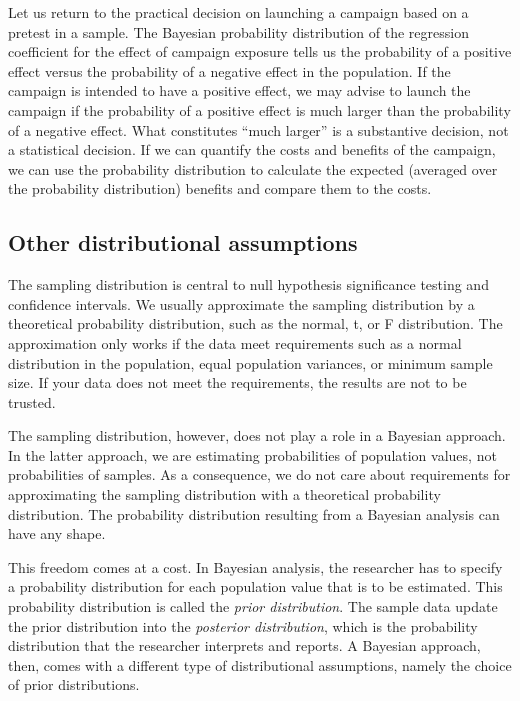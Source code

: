 \documentclass[doc]{apa6}
\begin{document}
Let us return to the practical decision on launching a campaign based on
a pretest in a sample. The Bayesian probability distribution of the
regression coefficient for the effect of campaign exposure tells us the
probability of a positive effect versus the probability of a negative
effect in the population. If the campaign is intended to have a positive
effect, we may advise to launch the campaign if the probability of a
positive effect is much larger than the probability of a negative
effect. What constitutes \enquote{much larger} is a substantive
decision, not a statistical decision. If we can quantify the costs and
benefits of the campaign, we can use the probability distribution to
calculate the expected (averaged over the probability distribution)
benefits and compare them to the costs.

\subsection{Other distributional assumptions}\label{assumptions}

The sampling distribution is central to null hypothesis significance
testing and confidence intervals. We usually approximate the sampling
distribution by a theoretical probability distribution, such as the
normal, t, or F distribution. The approximation only works if the data
meet requirements such as a normal distribution in the population, equal
population variances, or minimum sample size. If your data does not meet
the requirements, the results are not to be trusted.

The sampling distribution, however, does not play a role in a Bayesian
approach. In the latter approach, we are estimating probabilities of
population values, not probabilities of samples. As a consequence, we do
not care about requirements for approximating the sampling distribution
with a theoretical probability distribution. The probability
distribution resulting from a Bayesian analysis can have any shape.

This freedom comes at a cost. In Bayesian analysis, the researcher has
to specify a probability distribution for each population value that is
to be estimated. This probability distribution is called the \emph{prior
distribution}. The sample data update the prior distribution into the
\emph{posterior distribution}, which is the probability distribution
that the researcher interprets and reports. A Bayesian approach, then,
comes with a different type of distributional assumptions, namely the
choice of prior distributions.
\end{document}
